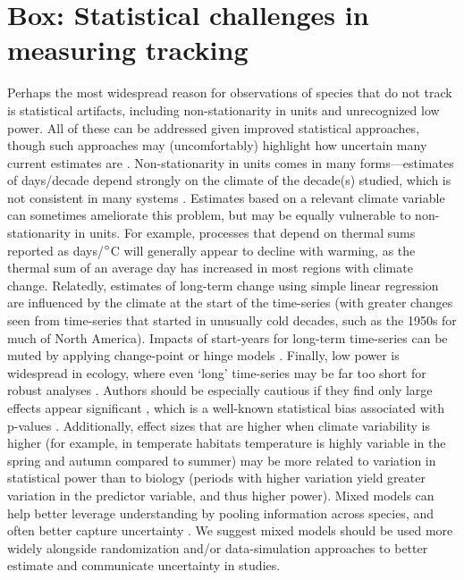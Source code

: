 \documentclass[11pt,letterpaper]{article}
\begin{document}
\section{Box: Statistical challenges in measuring tracking}
Perhaps the most widespread reason for observations of species that do not track is statistical artifacts, including non-stationarity in units and unrecognized low power. All of these can be addressed given improved statistical approaches, though such approaches may (uncomfortably) highlight how uncertain many current estimates are \citep{brown2016}. Non-stationarity in units comes in many forms---estimates of days/decade depend strongly on the climate of the decade(s) studied, which is not consistent in many systems \citep{Ault2011,McCabe2012}. Estimates based on a relevant climate variable can sometimes ameliorate this problem, but may be equally vulnerable to non-stationarity in units. For example, processes that depend on thermal sums reported as days/$\degree$C will generally appear to decline with warming, as the thermal sum of an average day has increased in most regions with climate change. Relatedly, estimates of long-term change using simple linear regression are influenced by the climate at the start of the time-series (with greater changes seen from time-series that started in unusually cold decades, such as the 1950s for much of North America). Impacts of start-years for long-term time-series can be muted by applying change-point or hinge models \citep[e.g.,][]{kharouba2018}. Finally, low power is widespread in ecology, where even `long' time-series may be far too short for robust analyses \citep{bolmgren2013,kharouba2018}. Authors should be especially cautious if they find only large effects appear significant \citep[e.g.,][]{CaraDonna2014}, which is a well-known statistical bias associated with p-values \citep{loken2017}. Additionally, effect sizes that are higher when climate variability is higher (for example, in temperate habitats temperature is highly variable in the spring and autumn compared to summer) may be more related to variation in statistical power than to biology (periods with higher variation yield greater variation in the predictor variable, and thus higher power). Mixed models can help better leverage understanding by pooling information across species, and often better capture uncertainty \citep{pearse2017}. We suggest mixed models should be used more widely alongside randomization and/or data-simulation approaches \citep[e.g.,][]{bolmgren2013,kharouba2018} to better estimate and communicate uncertainty in studies. 
\end{document}
